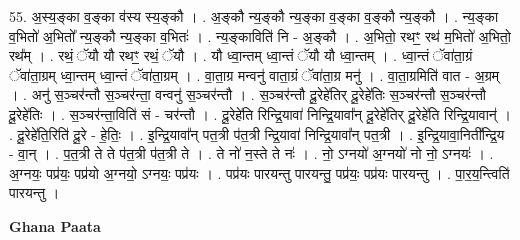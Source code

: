 \documentclass[17pt]{extarticle}
\begin{document}
55. अ॒स्य॒ङ्का व॒ङ्का व॑स्य स्य॒ङ्कौ । . अ॒ङ्कौ न्य॒ङ्कौ न्य॒ङ्का व॒ङ्का व॒ङ्कौ न्य॒ङ्कौ । . न्य॒ङ्का व॒भितो॑ अ॒भितो᳚ न्य॒ङ्कौ न्य॒ङ्का व॒भितः॑ । . न्य॒ङ्काविति॑ नि - अ॒ङ्कौ । . अ॒भितो॒ रथꣳ॒॒ रथ॑ म॒भितो॑ अ॒भितो॒ रथ᳚म् । . रथं॒ ॅयौ यौ रथꣳ॒॒ रथं॒ ॅयौ । . यौ ध्वा॒न्तम् ध्वा॒न्तं ॅयौ यौ ध्वा॒न्तम् । . ध्वा॒न्तं ॅवा॑ता॒ग्रं ॅवा॑ता॒ग्रम् ध्वा॒न्तम् ध्वा॒न्तं ॅवा॑ता॒ग्रम् । . वा॒ता॒ग्र मन्वनु॑ वाता॒ग्रं ॅवा॑ता॒ग्र मनु॑ । . वा॒ता॒ग्रमिति॑ वात - अ॒ग्रम् । . अनु॑ स॒ञ्चर॑न्तौ स॒ञ्चर॑न्ता॒ वन्वनु॑ स॒ञ्चर॑न्तौ । . स॒ञ्चर॑न्तौ दू॒रेहे॑तिर् दू॒रेहे॑तिः स॒ञ्चर॑न्तौ स॒ञ्चर॑न्तौ दू॒रेहे॑तिः । . स॒ञ्चर॑न्ता॒विति॑ सं - चर॑न्तौ । . दू॒रेहे॑ति रिन्द्रि॒यावा॑ निन्द्रि॒यावा᳚न् दू॒रेहे॑तिर् दू॒रेहे॑ति रिन्द्रि॒यावान्॑ । . दू॒रेहे॑ति॒रिति॑ दू॒रे - हे॒तिः॒ । . इ॒न्द्रि॒यावा᳚न् पत॒त्री प॑त॒त्री न्द्रि॒यावा॑ निन्द्रि॒यावा᳚न् पत॒त्री । . इ॒न्द्रि॒यावा॒निती᳚न्द्रि॒य - वा॒न् । . प॒त॒त्री ते ते प॑त॒त्री प॑त॒त्री ते । . ते नो॑ न॒स्ते ते नः॑ । . नो॒ ऽग्नयो॑ अ॒ग्नयो॑ नो नो॒ ऽग्नयः॑ । . अ॒ग्नयः॒ पप्र॑यः॒ पप्र॑यो अ॒ग्नयो॒ ऽग्नयः॒ पप्र॑यः । . पप्र॑यः पारयन्तु पारयन्तु॒ पप्र॑यः॒ पप्र॑यः पारयन्तु । . पा॒र॒य॒न्त्विति॑ पारयन्तु । \newline

\textbf{Ghana Paata } \newline
\end{document}
